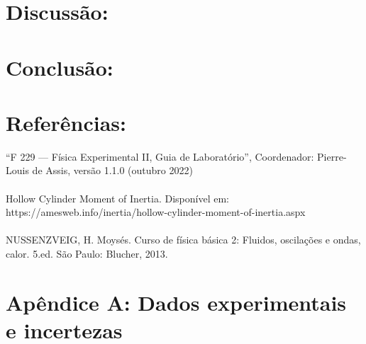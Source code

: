 \documentclass[a4paper]{report}
\begin{document}
\section*{Discussão:}
\section*{Conclusão:}
\section*{Referências:}
“F 229 — Física Experimental II, Guia de Laboratório”, Coordenador: Pierre-Louis de Assis, versão 1.1.0 (outubro 2022) \\ \ \\ 
\qquad Hollow Cylinder Moment of Inertia. Disponível em: https://amesweb.info/inertia/hollow-cylinder-moment-of-inertia.aspx\\ \ \\ 
NUSSENZVEIG, H. Moysés. Curso de física básica 2: Fluidos, oscilações e ondas, calor. 5.ed. São Paulo: Blucher, 2013.

\section*{Apêndice A: Dados experimentais e incertezas}
\end{document}
